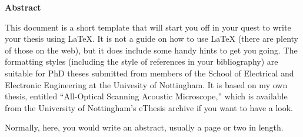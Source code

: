 \vspace*{5cm}
\begin{center}

\textbf{Abstract}
\end{center}

\normalsize

This document is a short template that will start you off in your quest
to write your thesis using \LaTeX{}. It is not a guide on how to use \LaTeX{}
(there are plenty of those on the web), but it does include some handy
hints to get you going. The formatting styles (including the style of
references in your bibliography) are suitable for PhD theses submitted
from members of the School of Electrical and Electronic Engineering at
the Univesity of Nottingham. It is based on my own thesis, entitled
``All-Optical Scanning Acoustic Microscope,'' which is available from 
the University of Nottingham's eThesis archive if you want to have a
look.

Normally, here, you would write an abstract, usually a page or two in
length.

